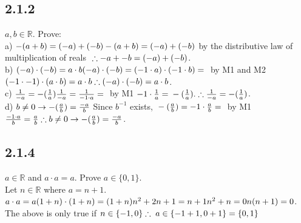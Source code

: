 \documentclass{article}
\begin{document}
\subsection{2.1.2}
$a, b \in \mathbb{R}$. Prove:
\\a) $-(a+b) = (-a) + (-b)
\\-(a+b) = (-a) + (-b) $ by the distributive law of multiplication of reals $
\\\therefore -a+-b = (-a) + (-b)$.
\\b) $(-a) \cdot (-b) = a \cdot b
(-a) \cdot (-b) = (-1 \cdot a) \cdot (-1 \cdot b) =
\\$ by M1 and M2 $ (-1 \cdot -1) \cdot (a \cdot b) = 
\\a \cdot b
\\\therefore (-a) \cdot (-b) = a \cdot b$.
\\c) $\frac{1}{-a} = -(\frac{1}{a})
\\\frac{1}{-a} =
\\\frac{1}{-1 \cdot a} = 
\\$ by M1 $ -1 \cdot \frac{1}{a} = 
\\-(\frac{1}{a}).
\\\therefore \frac{1}{-a} = -(\frac{1}{a})$.
\\d) $b \neq 0 \rightarrow -(\frac{a}{b}) = \frac{-a}{b}
\\$ Since $b^{-1}$ exists, $
\\-(\frac{a}{b}) = -1 \cdot \frac{a}{b} =
\\$ by M1 $ \frac{-1 \cdot a}{b} =
\\\frac{a}{b}
\\\therefore b \neq 0 \rightarrow -(\frac{a}{b}) = \frac{-a}{b}$.

\subsection{2.1.4}
$a \in \mathbb{R}$ and $a \cdot a = a$. Prove $a \in \{0, 1\}$.
\\Let $n \in \mathbb{R}$ where $a = n+1$.
\\$a \cdot a = a
\\(1+n) \cdot (1+n) = (1+n)
\\n^2 + 2n +1 = n + 1
\\n^2 + n = 0
\\n(n+1) = 0$.
\\The above is only true if $n \in \{-1, 0\}
\\\therefore \; a \in \{-1+1, 0+1\} = \{0, 1\} $
\end{document}
